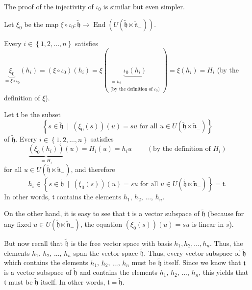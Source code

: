 \documentclass[etingof-lie.tex]{subfiles}
\begin{document}
\begin{verlong}
The proof of the injectivity of $\iota_{0}$ is similar but even simpler.

Let $\xi_{0}$ be the map $\xi\circ\iota_{0}:\widetilde{\mathfrak{h}%
}\rightarrow\operatorname*{End}\left(  U\left(  \widetilde{\mathfrak{h}%
}\ltimes\widetilde{\mathfrak{n}}_{-}\right)  \right)  $.

Every $i\in\left\{  1,2,...,n\right\}  $ satisfies $\underbrace{\xi_{0}}%
_{=\xi\circ\iota_{0}}\left(  h_{i}\right)  =\left(  \xi\circ\iota_{0}\right)
\left(  h_{i}\right)  =\xi\left(  \underbrace{\iota_{0}\left(  h_{i}\right)
}_{\substack{=h_{i}\\\text{(by the definition of }\iota_{0}\text{)}}}\right)
=\xi\left(  h_{i}\right)  =H_{i}$ (by the definition of $\xi$).

Let $\mathfrak{t}$ be the subset%
\[
\left\{  s\in\widetilde{\mathfrak{h}}\ \mid\ \left(  \xi_{0}\left(  s\right)
\right)  \left(  u\right)  =su\text{ for all }u\in U\left(
\widetilde{\mathfrak{h}}\ltimes\widetilde{\mathfrak{n}}_{-}\right)  \right\}
\]
of $\widetilde{\mathfrak{h}}$. Every $i\in\left\{  1,2,...,n\right\}  $
satisfies%
\[
\underbrace{\left(  \xi_{0}\left(  h_{i}\right)  \right)  }_{=H_{i}}\left(
u\right)  =H_{i}\left(  u\right)  =h_{i}u\ \ \ \ \ \ \ \ \ \ \left(  \text{by
the definition of }H_{i}\right)
\]
for all $u\in U\left(  \widetilde{\mathfrak{h}}\ltimes\widetilde{\mathfrak{n}%
}_{-}\right)  $, and therefore%
\[
h_{i}\in\left\{  s\in\widetilde{\mathfrak{h}}\ \mid\ \left(  \xi_{0}\left(
s\right)  \right)  \left(  u\right)  =su\text{ for all }u\in U\left(
\widetilde{\mathfrak{h}}\ltimes\widetilde{\mathfrak{n}}_{-}\right)  \right\}
=\mathfrak{t}.
\]
In other words, $\mathfrak{t}$ contains the elements $h_{1}$, $h_{2}$, $...$,
$h_{n}$.

On the other hand, it is easy to see that $\mathfrak{t}$ is a vector subspace
of $\widetilde{\mathfrak{h}}$ (because for any fixed $u\in U\left(
\widetilde{\mathfrak{h}}\ltimes\widetilde{\mathfrak{n}}_{-}\right)  $, the
equation $\left(  \xi_{0}\left(  s\right)  \right)  \left(  u\right)  =su$ is
linear in $s$).

But now recall that $\widetilde{\mathfrak{h}}$ is the free vector space with
basis $h_{1},h_{2},...,h_{n}$. Thus, the elements $h_{1}$, $h_{2}$, $...$,
$h_{n}$ span the vector space $\widetilde{\mathfrak{h}}$. Thus, every vector
subspace of $\widetilde{\mathfrak{h}}$ which contains the elements $h_{1}$,
$h_{2}$, $...$, $h_{n}$ must be $\widetilde{\mathfrak{h}}$ itself. Since we
know that $\mathfrak{t}$ is a vector subspace of $\widetilde{\mathfrak{h}}$
and contains the elements $h_{1}$, $h_{2}$, $...$, $h_{n}$, this yields that
$\mathfrak{t}$ must be $\widetilde{\mathfrak{h}}$ itself. In other words,
$\mathfrak{t}=\widetilde{\mathfrak{h}}$.


\end{verlong}
\end{document}
